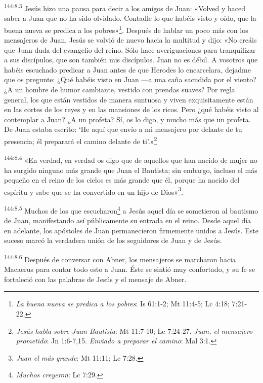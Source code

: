 \par
\textsuperscript{144:8.3} Jesús hizo una pausa para decir a los amigos de Juan: «Volved y haced saber a Juan que no ha sido olvidado. Contadle lo que habéis visto y oído, que la buena nueva se predica a los pobres»\footnote{\textit{La buena nueva se predica a los pobres}: Is 61:1-2; Mt 11:4-5; Lc 4:18; 7:21-22.}. Después de hablar un poco más con los mensajeros de Juan, Jesús se volvió de nuevo hacia la multitud y dijo: «No creáis que Juan duda del evangelio del reino. Sólo hace averiguaciones para tranquilizar a sus discípulos, que son también mis discípulos. Juan no es débil. A vosotros que habéis escuchado predicar a Juan antes de que Herodes lo encarcelara, dejadme que os pregunte: ¿Qué habéis visto en Juan ---a una caña sacudida por el viento? ¿A un hombre de humor cambiante, vestido con prendas suaves? Por regla general, los que están vestidos de manera suntuosa y viven exquisitamente están en las cortes de los reyes y en las mansiones de los ricos. Pero ¿qué habéis visto al contemplar a Juan? ¿A un profeta? Sí, os lo digo, y mucho más que un profeta. De Juan estaba escrito: `He aquí que envío a mi mensajero por delante de tu presencia; él preparará el camino delante de ti'.»\footnote{\textit{Jesús habla sobre Juan Bautista}: Mt 11:7-10; Lc 7:24-27. \textit{Juan, el mensajero prometido}: Jn 1:6-7,15. \textit{Enviado a preparar el camino}: Mal 3:1.}

\par
\textsuperscript{144:8.4} «En verdad, en verdad os digo que de aquellos que han nacido de mujer no ha surgido ninguno más grande que Juan el Bautista; sin embargo, incluso el más pequeño en el reino de los cielos es más grande que él, porque ha nacido del espíritu y sabe que se ha convertido en un hijo de Dios»\footnote{\textit{Juan el más grande}: Mt 11:11; Lc 7:28.}.

\par
\textsuperscript{144:8.5} Muchos de los que escucharon\footnote{\textit{Muchos creyeron}: Lc 7:29.} a Jesús aquel día se sometieron al bautismo de Juan, manifestando así públicamente su entrada en el reino. Desde aquel día en adelante, los apóstoles de Juan permanecieron firmemente unidos a Jesús. Este suceso marcó la verdadera unión de los seguidores de Juan y de Jesús.

\par
\textsuperscript{144:8.6} Después de conversar con Abner, los mensajeros se marcharon hacia Macaerus para contar todo esto a Juan. Éste se sintió muy confortado, y su fe se fortaleció con las palabras de Jesús y el mensaje de Abner.

